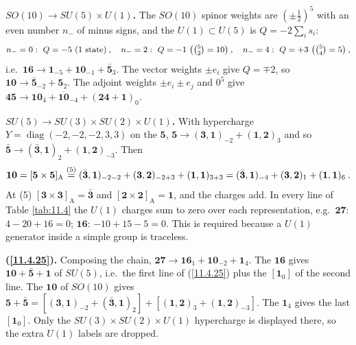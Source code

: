 \begin{tcolorbox}[breakable]
\begin{remark}
		\textbf{$SO(10)\to SU(5)\times U(1)$.} The $SO(10)$ spinor weights are $(\pm\frac{1}{2})^{5}$ with an even number $n_{-}$ of minus signs, and the $U(1)\subset U(5)$ is $Q=-2\sum_{i}s_{i}$:
		\begin{equation*}
			n_{-}=0:\ Q=-5\ (1\text{ state})\:,\quad n_{-}=2:\ Q=-1\ \bigl(\tbinom{5}{2}=10\bigr)\:,\quad n_{-}=4:\ Q=+3\ \bigl(\tbinom{5}{4}=5\bigr)\:,
		\end{equation*}
		i.e.\ $\mathbf{16}\to\mathbf{1}_{-5}+\mathbf{10}_{-1}+\bar{\mathbf{5}}_{3}$. The vector weights $\pm e_{i}$ give $Q=\mp2$, so $\mathbf{10}\to\bar{\mathbf{5}}_{-2}+\mathbf{5}_{2}$. The adjoint weights $\pm e_{i}\pm e_{j}$ and $0^{5}$ give $\mathbf{45}\to\mathbf{10}_{4}+\overline{\mathbf{10}}_{-4}+(\mathbf{24}+\mathbf{1})_{0}$.

		\textbf{$SU(5)\to SU(3)\times SU(2)\times U(1)$.} With hypercharge $Y=\operatorname{diag}(-2,-2,-2,3,3)$ on the $\mathbf{5}$, $\mathbf{5}\to(\mathbf{3},\mathbf{1})_{-2}+(\mathbf{1},\mathbf{2})_{3}$ and so $\bar{\mathbf{5}}\to(\bar{\mathbf{3}},\mathbf{1})_{2}+(\mathbf{1},\mathbf{2})_{-3}$. Then
		\begin{equation*}
			\mathbf{10}=[\mathbf{5}\times\mathbf{5}]_{\text{A}}\overset{(5)}{=}(\bar{\mathbf{3}},\mathbf{1})_{-2-2}+(\mathbf{3},\mathbf{2})_{-2+3}+(\mathbf{1},\mathbf{1})_{3+3}
			=(\bar{\mathbf{3}},\mathbf{1})_{-4}+(\mathbf{3},\mathbf{2})_{1}+(\mathbf{1},\mathbf{1})_{6}\:.
		\end{equation*}
		At (5) $[\mathbf{3}\times\mathbf{3}]_{\text{A}}=\bar{\mathbf{3}}$ and $[\mathbf{2}\times\mathbf{2}]_{\text{A}}=\mathbf{1}$, and the charges add.
		In every line of Table \ref{tab:11.4} the $U(1)$ charges sum to zero over each representation, e.g.\ $\mathbf{27}$: $4-20+16=0$; $\mathbf{16}$: $-10+15-5=0$. This is required because a $U(1)$ generator inside a simple group is traceless.

		\textbf{(\ref{11.4.25}).} Composing the chain, $\mathbf{27}\to\mathbf{16}_{1}+\mathbf{10}_{-2}+\mathbf{1}_{4}$. The $\mathbf{16}$ gives $\mathbf{10}+\bar{\mathbf{5}}+\mathbf{1}$ of $SU(5)$, i.e.\ the first line of (\ref{11.4.25}) plus the $[\mathbf{1}_{0}]$ of the second line. The $\mathbf{10}$ of $SO(10)$ gives $\mathbf{5}+\bar{\mathbf{5}}=[(\mathbf{3},\mathbf{1})_{-2}+(\bar{\mathbf{3}},\mathbf{1})_{2}]+[(\mathbf{1},\mathbf{2})_{3}+(\mathbf{1},\mathbf{2})_{-3}]$. The $\mathbf{1}_{4}$ gives the last $[\mathbf{1}_{0}]$. Only the $SU(3)\times SU(2)\times U(1)$ hypercharge is displayed there, so the extra $U(1)$ labels are dropped.
	\end{remark}
\end{tcolorbox}

